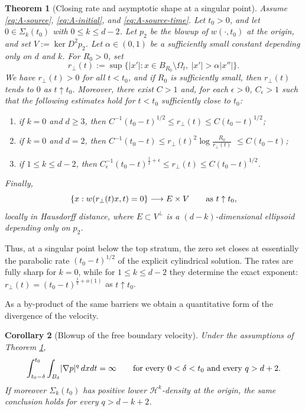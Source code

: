 \documentclass[11pt]{amsart}
\numberwithin{equation}{section}
\numberwithin{figure}{section}
\theoremstyle{plain}
\newtheorem{thm}{Theorem}[section]
\newtheorem{cor}[thm]{Corollary}
\theoremstyle{definition}
\theoremstyle{remark}
\theoremstyle{plain}
\newcommand{\abs}[1]{\lvert #1 \rvert}
\begin{document}
\begin{thm}[Closing rate and asymptotic shape at a singular point]\label{thm:closing-rates}
Assume \eqref{eq:A-source}, \eqref{eq:A-initial}, and \eqref{eq:A-source-time}. Let $t_0>0$, and let
$0\in\Sigma_k(t_0)$ with $0\leq k\leq d-2$. Let $p_2$ be the blowup of $w(\cdot,t_0)$ at the
origin, and set $V:=\ker D^2p_2$. Let $\alpha\in(0,1)$ be a
sufficiently small constant depending only on $d$ and $k$. For $R_0>0$, set
\begin{equation}\label{eq:intro-r-perp}
    r_\perp(t):=
    \sup\bigl\{\abs{x'}:x\in B_{R_0}\setminus\Omega_t,\
    \abs{x'}>\alpha\abs{x''}\bigr\}.
\end{equation}
We have $r_\perp(t)>0$ for all $t<t_0$, and if $R_0$ is sufficiently small, then $r_\perp(t)$ tends to $0$ as
$t\uparrow t_0$. Moreover, there exist $C>1$ and, for each $\epsilon>0$,
$C_\epsilon>1$ such that the following estimates hold for $t<t_0$
sufficiently close to $t_0$:
\begin{enumerate}[label=(\roman*)]
\item\label{item:intro-closing-high-d}
if $k=0$ and $d\geq3$, then
$C^{-1}(t_0-t)^{1/2}\leq r_\perp(t)\leq C(t_0-t)^{1/2}$;
\item\label{item:intro-closing-d2}
if $k=0$ and $d=2$, then
$C^{-1}(t_0-t)\leq r_\perp(t)^2\log\frac{R_0}{r_\perp(t)}$
$\leq C(t_0-t)$;
\item\label{item:intro-closing-intermediate}
if $1\leq k\leq d-2$, then
$C_\epsilon^{-1}(t_0-t)^{\frac12+\epsilon}\leq r_\perp(t)\leq C(t_0-t)^{1/2}$.
\end{enumerate}
Finally,
\begin{equation}\label{eq:intro-cylinder-limit}
    \{x:w(r_\perp(t)x,t)=0\}\longrightarrow E \times V
    \qquad\hbox{as }t\uparrow t_0,
\end{equation}
locally in Hausdorff distance, where $E\subset V^\perp$ is a $(d-k)$-dimensional ellipsoid depending
only on $p_2$.
\end{thm}

Thus, at a singular point below the top stratum, the zero set closes at essentially the
parabolic rate $(t_0-t)^{1/2}$ of the explicit cylindrical solution.
The rates are fully sharp for $k=0$, while for $1\leq k\leq d-2$ they determine
the exact exponent: $r_\perp(t)=(t_0-t)^{\frac12+o(1)}$ as $t\uparrow t_0$.

As a by-product of the same barriers we obtain a quantitative form of the divergence of the
velocity.

\begin{cor}[Blowup of the free boundary velocity]\label{prop:gradient-lq-blowup}
Under the assumptions of Theorem \ref{thm:closing-rates},
\[
    \int_{t_0-\delta}^{t_0}\int_{B_\delta}\abs{\nabla p}^q\,dxdt=\infty
    \qquad\hbox{for every }0<\delta<t_0\hbox{ and every }q>d+2 .
\]
If moreover $\Sigma_k(t_0)$ has positive lower $\mathcal H^k$-density at the origin, the same
conclusion holds for every $q>d-k+2$.
\end{cor}
\end{document}
